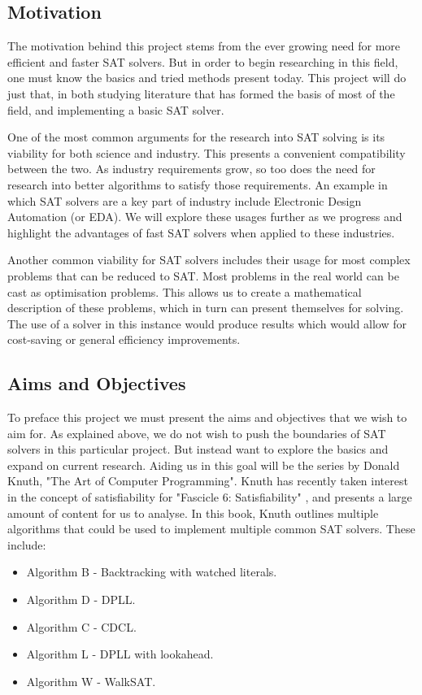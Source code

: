 \documentclass{article}
\begin{document}
\subsection{Motivation}
The motivation behind this project stems from the ever growing need for more efficient and faster SAT solvers. But in order to begin researching in this field, one must know the basics and tried methods present today. This project will do just that, in both studying literature that has formed the basis of most of the field, and implementing a basic SAT solver.

One of the most common arguments for the research into SAT solving is its viability for both science and industry. This presents a convenient compatibility between the two. As industry requirements grow, so too does the need for research into better algorithms to satisfy those requirements. An example in which SAT solvers are a key part of industry include Electronic Design Automation (or EDA). We will explore these usages further as we progress and highlight the advantages of fast SAT solvers when applied to these industries.

Another common viability for SAT solvers includes their usage for most complex problems that can be reduced to SAT. Most problems in the real world can be cast as optimisation problems. This allows us to create a mathematical description of these problems, which in turn can present themselves for solving. The use of a solver in this instance would produce results which would allow for cost-saving or general efficiency improvements.

\subsection{Aims and Objectives}
To preface this project we must present the aims and objectives that we wish to aim for. As explained above, we do not wish to push the boundaries of SAT solvers in this particular project. But instead want to explore the basics and expand on current research. Aiding us in this goal will be the series by Donald Knuth, "The Art of Computer Programming". Knuth has recently taken interest in the concept of satisfiability for "Fascicle 6: Satisfiability" , and presents a large amount of content for us to analyse. In this book, Knuth outlines multiple algorithms that could be used to implement multiple common SAT solvers\cite{donald}. These include:

\begin{itemize}
    \item Algorithm B - Backtracking with watched literals.
    \item Algorithm D - DPLL.
    \item Algorithm C - CDCL.
    \item Algorithm L - DPLL with lookahead.
    \item Algorithm W - WalkSAT.
\end{itemize}
\end{document}
